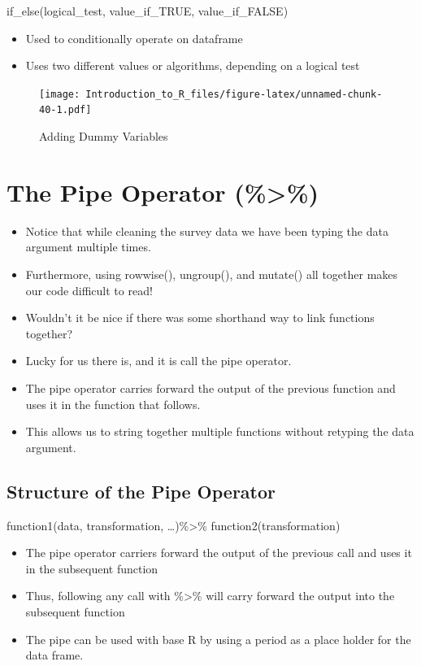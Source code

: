 \documentclass[]{book}
\providecommand{\tightlist}{%
  \setlength{\itemsep}{0pt}\setlength{\parskip}{0pt}}
\theoremstyle{definition}
\theoremstyle{definition}
\theoremstyle{definition}
\theoremstyle{remark}
\begin{document}
if\_else(logical\_test, value\_if\_TRUE, value\_if\_FALSE)

\begin{itemize}
\tightlist
\item
  Used to conditionally operate on dataframe
\item
  Uses two different values or algorithms, depending on a logical test
\end{itemize}

\begin{figure}
\centering
\texttt{[image: Introduction\_to\_R\_files/figure-latex/unnamed-chunk-40-1.pdf]}
\caption{\label{fig:unnamed-chunk-40}Adding Dummy Variables}
\end{figure}

\hypertarget{the-pipe-operator}{%
\section{The Pipe Operator (\%\textgreater{}\%)}\label{the-pipe-operator}}

\begin{itemize}
\tightlist
\item
  Notice that while cleaning the survey data we have been typing the data argument multiple times.
\item
  Furthermore, using rowwise(), ungroup(), and mutate() all together makes our code difficult to read!
\item
  Wouldn't it be nice if there was some shorthand way to link functions together?
\item
  Lucky for us there is, and it is call the pipe operator.
\item
  The pipe operator carries forward the output of the previous function and uses it in the function that follows.
\item
  This allows us to string together multiple functions without retyping the data argument.
\end{itemize}

\hypertarget{structure-of-the-pipe-operator}{%
\subsection{Structure of the Pipe Operator}\label{structure-of-the-pipe-operator}}

function1(data, transformation, \ldots{})\%\textgreater{}\%
function2(transformation)

\begin{itemize}
\tightlist
\item
  The pipe operator carriers forward the output of the previous call and uses it in the subsequent function
\item
  Thus, following any call with \%\textgreater{}\% will carry forward the output into the subsequent function
\item
  The pipe can be used with base R by using a period as a place holder for the data frame.
\end{itemize}
\end{document}
